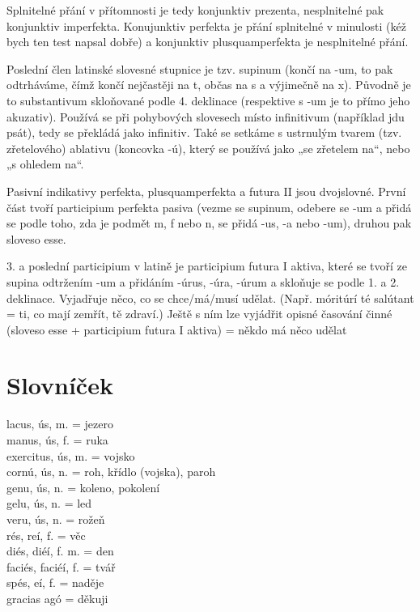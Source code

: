 \documentclass[12pt]{article}					%
\begin{document}
Splnitelné přání v přítomnosti je tedy konjunktiv prezenta, nesplnitelné pak konjunktiv imperfekta. Konujunktiv perfekta je přání splnitelné v minulosti (kéž bych ten test napsal dobře) a konjunktiv plusquamperfekta je nesplnitelné přání.


Poslední člen latinské slovesné stupnice je tzv. supinum (končí na -um, to pak odtrháváme, čímž končí nejčastěji na t, občas na s a výjimečně na x). Původně je to substantivum skloňované podle 4. deklinace (respektive s -um je to přímo jeho akuzativ). Používá se při pohybových slovesech místo infinitivum (například jdu psát), tedy se překládá jako infinitiv. Také se setkáme s ustrnulým tvarem (tzv. zřetelového) ablativu (koncovka -ú), který se používá jako „se zřetelem na“, nebo „s ohledem na“.

Pasivní indikativy perfekta, plusquamperfekta a futura II jsou dvojslovné. První část tvoří participium perfekta pasiva (vezme se supinum, odebere se -um a přidá se podle toho, zda je podmět m, f nebo n, se přidá -us, -a nebo -um), druhou pak sloveso esse.



3. a poslední participium v latině je participium futura I aktiva, které se tvoří ze supina odtržením -um a přidáním -úrus, -úra, -úrum a skloňuje se podle 1. a 2. deklinace. Vyjadřuje něco, co se chce/má/musí udělat. (Např. móritúrí té salútant = ti, co mají zemřít, tě zdraví.) Ještě s ním lze vyjádřit opisné časování činné (sloveso esse + participium futura I aktiva) = někdo má něco udělat

\newpage
\section{Slovníček}
    lacus, ús, m. = jezero\\
    manus, ús, f. = ruka\\
    exercitus, ús, m. = vojsko\\
    cornú, ús, n. = roh, křídlo (vojska), paroh\\
    genu, ús, n. = koleno, pokolení\\
    gelu, ús, n. = led\\
    veru, ús, n. = rožeň\\
    rés, reí, f. = věc\\
    diés, diéí, f. m. = den\\
    faciés, faciéí, f. = tvář\\
    spés, eí, f. = naděje\\
    gracias agó = děkuji\\

    

    
\end{document}
